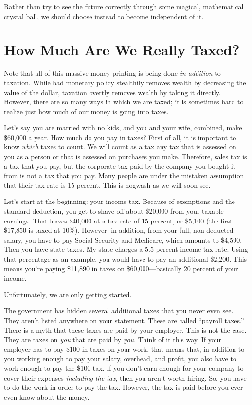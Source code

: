 Rather than try to see the future correctly through some magical,
mathematical crystal ball, we should choose instead to become
independent of it.

\section{How Much Are We Really Taxed?}

Note that all of this massive money printing is being done \textit{in
addition }to taxation. While bad monetary policy stealthily removes
wealth by decreasing the value of the dollar, taxation overtly removes
wealth by taking it directly. However, there are so many ways in which
we are taxed; it is sometimes hard to realize just how much of our
money is going into taxes.


Let’s say you are married with no kids, and you and your wife, combined,
make \$60,000 a year. How much do you pay in taxes?  First of all, it
is important to know \textit{which} taxes to count. We will count as a
tax any tax that is assessed on you as a person or that is assessed on
purchases you make. Therefore, sales tax is a tax that you pay, but the
corporate tax paid by the company you bought it from is not a tax that
you pay. Many people are under the mistaken assumption that their tax
rate is 15 percent. This is hogwash as we will soon see.


Let’s start at the beginning: your income tax. Because of exemptions and
the standard deduction, you get to shave off about \$20,000 from your
taxable earnings.
That leaves \$40,000 at a tax rate of 15 percent, or \$5,100 (the first
\$17,850 is taxed at 10\%). However, in addition, from your full,
non-deducted salary, you have to pay Social Security and Medicare,
which amounts to \$4,590. Then you have state taxes. My state charges a
5.5 percent income tax
rate. Using that
percentage as an example, you would have to pay an additional \$2,200.
This means you’re
paying \$11,890 in taxes on \$60,000—basically 20 percent of
your income. 


Unfortunately, we are
only getting started.


The government has hidden several additional taxes that you never even
see. They aren’t listed anywhere on your statement. These are called
“payroll taxes.”  There is a myth that these taxes are paid by your
employer. This is not the case. They are taxes on \textit{you }that are
paid by\textit{ you}. Think of it this way. If your employer has to pay
\$100 in taxes on
your work, that means that, in addition to you working enough to pay
your salary, overhead, and profit, you also have to work enough to pay
the \$100 tax. If you don’t earn enough for your company to cover their
expenses \textit{including the tax}, then you aren’t worth hiring. So,
you have to do the work in order to pay the tax. However, the tax is
paid before you ever even know about the money.


